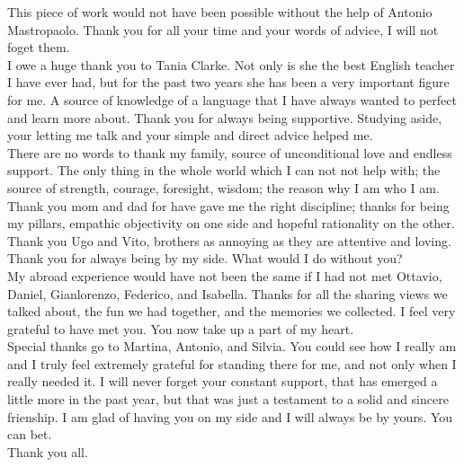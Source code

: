 \begin{acknowledgements}
This piece of work would not have been possible without the help of Antonio Mastropaolo. 
Thank you for all your time and your words of advice, I will not foget them.\\
\newline
I owe a huge thank you to Tania Clarke. Not only is she the best English teacher I have ever had, 
but for the past two years she has been a very important figure for me. A source of knowledge
of a language that I have always wanted to perfect and learn more about. Thank you for always being supportive.
Studying aside, your letting me talk and your simple and direct advice helped me.\\
\newline
There are no words to thank my family, source of unconditional love and endless support. 
The only thing in the whole world which I can not not help with;
the source of strength, courage, foresight, wisdom; the reason why I am who I am.
Thank you mom and dad for have gave me the right discipline; thanks for being my pillars, 
empathic objectivity on one side and hopeful rationality on the other. Thank you Ugo and Vito, 
brothers as annoying as they are attentive and loving. Thank you for always being by my side. What would I do without you?\\
\newline
My abroad experience would have not been the same if I had not met Ottavio, Daniel, Gianlorenzo, Federico, and Isabella. 
Thanks for all the sharing views we talked about, the fun we had together, and the memories we collected. I feel very grateful to have met you.
You now take up a part of my heart.\\
\newline
Special thanks go to Martina, Antonio, and Silvia. 
You could see how I really am and I truly feel extremely grateful 
for standing there for me, and not only when I really needed it. 
I will never forget your constant support, that has emerged a little more in the past year, but that was 
just a testament to a solid and sincere frienship. I am glad of having you on my side and I will always be by yours.
You can bet.\\
\newline
Thank you all.
\end{acknowledgements}